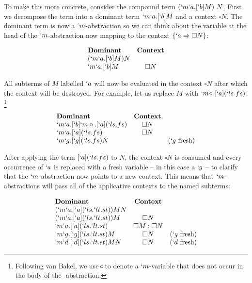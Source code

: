   To make this more concrete, consider the compound term $(`m`a.[`b]M)\ N$. 
  First we decompose the term into a dominant term $`m`a.[`b]M$ and a context $\square N$. 
  The dominant term is now a $`m$-abstraction so we can think about the variable at the head of the $`m$-abstraction now mapping to the context $\{`a \Rightarrow \square N\}$:
  
  \begin{example}[]
  \[
  \begin{array}{lc}
    \textbf{Dominant} & \textbf{Context} \\
    (`m`a.[`b]M) N \\
    `m`a.[`b]M & \square N \\
  \end{array}
  \]
  \end{example}

  All subterms of $M$ labelled $`a$ will now be evaluated in the context $\square N$ after which the context will be destroyed. 
  For example, let us replace $M$ with \mbox{$`m\!\circ\!.[`a](`ls.fs)$}:
  \footnote{Following van Bakel, we use $\!\circ\!$ to denote a $`m$-variable that does not occur in the body of the \lmu-abstraction.}
  
  \begin{example}
    \[
    \begin{array}{lcr}
    \textbf{Dominant} & \textbf{Context} \\
    `m`a.[`b]`m\circ.[`a](`ls.fs)    & \square N \\
    `m`a.[`a](`ls.fs)    & \square N \\
    `m`g.[`g](`ls.fs)N   & & (`g\ \text{fresh})  \\
    \end{array}
    \]
  \end{example}

  After applying the term $[`a](`ls.fs)$ to $N$, 
  the context $\square N$ is consumed and every occurrence of $`a$ is replaced with a fresh variable 
  -- in this case a $`g$ -- 
  to clarify that the $`m$-abstraction now points to a new context. 
  This means that $`m$-abstractions will pass all of the applicative contexts to the named subterms:
  
  \begin{example}
    \[
    \begin{array}{lcr}
    \textbf{Dominant} & \textbf{Context} \\
    (`m`a.[`a](`ls.`lt.st)) M N \\
    (`m`a.[`a](`ls.`lt.st))M & \square N \\
    `m`a.[`a](`ls.`lt.st) & \square M:\square N \\
    `m`g.[`g](`ls.`lt.st)M & \square N & (`g\ \text{fresh}) \\
    `m`d.[`d](`ls.`lt.st)MN & \square N & (`d\ \text{fresh}) \\
    \end{array}
    \]
  \end{example}
  
